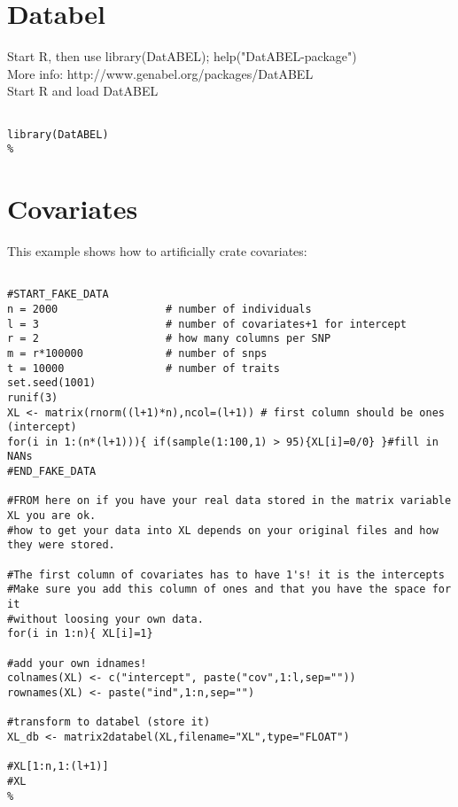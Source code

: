 \documentclass{report}
\begin{document}
\section{Databel}
Start R, then use library(DatABEL); help("DatABEL-package")\\
More info: http://www.genabel.org/packages/DatABEL\\
Start R and load DatABEL

\begin{lstlisting}[escapechar=\%]

library(DatABEL)
%
\end{lstlisting}

\section{Covariates}

This example shows how to artificially crate covariates:

\begin{lstlisting}[escapechar=\%]

#START_FAKE_DATA
n = 2000                 # number of individuals
l = 3                    # number of covariates+1 for intercept
r = 2                    # how many columns per SNP
m = r*100000             # number of snps
t = 10000                # number of traits
set.seed(1001)
runif(3)
XL <- matrix(rnorm((l+1)*n),ncol=(l+1)) # first column should be ones (intercept)
for(i in 1:(n*(l+1))){ if(sample(1:100,1) > 95){XL[i]=0/0} }#fill in NANs
#END_FAKE_DATA

#FROM here on if you have your real data stored in the matrix variable XL you are ok.
#how to get your data into XL depends on your original files and how they were stored.

#The first column of covariates has to have 1's! it is the intercepts
#Make sure you add this column of ones and that you have the space for it
#without loosing your own data.
for(i in 1:n){ XL[i]=1}

#add your own idnames!
colnames(XL) <- c("intercept", paste("cov",1:l,sep=""))
rownames(XL) <- paste("ind",1:n,sep="")

#transform to databel (store it)
XL_db <- matrix2databel(XL,filename="XL",type="FLOAT")

#XL[1:n,1:(l+1)]
#XL
%
\end{lstlisting}
\end{document}
